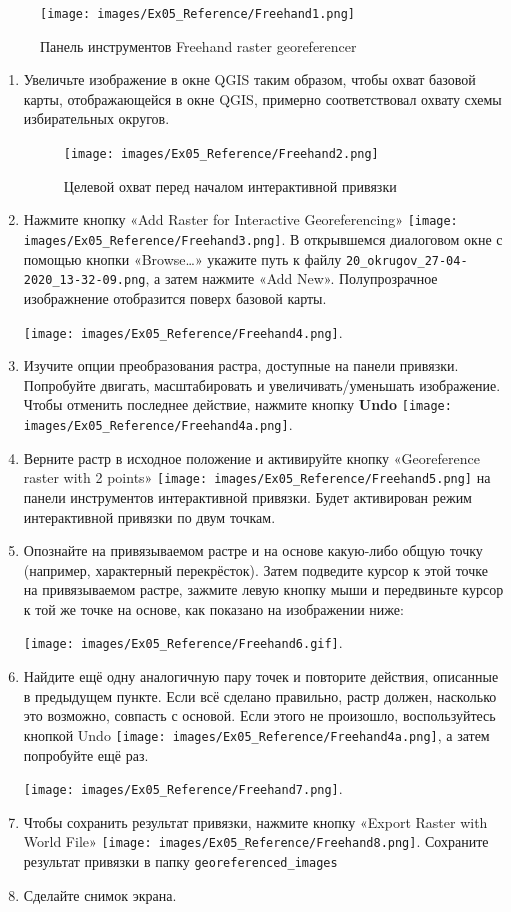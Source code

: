 \documentclass[
  12pt,
]{book}
\begin{document}
\begin{figure}
\centering
\texttt{[image: images/Ex05\_Reference/Freehand1.png]}
\caption{Панель инструментов Freehand raster georeferencer}
\end{figure}

\begin{enumerate}
\def\labelenumi{\arabic{enumi}.}
\setcounter{enumi}{4}
\item
  Увеличьте изображение в окне QGIS таким образом, чтобы охват базовой карты, отображающейся в окне QGIS, примерно соответствовал охвату схемы избирательных округов.

  \begin{figure}
  \centering
  \texttt{[image: images/Ex05\_Reference/Freehand2.png]}
  \caption{Целевой охват перед началом интерактивной привязки}
  \end{figure}
\item
  Нажмите кнопку «Add Raster for Interactive Georeferencing» \texttt{[image: images/Ex05\_Reference/Freehand3.png]}. В открывшемся диалоговом окне с помощью кнопки «Browse\ldots» укажите путь к файлу \texttt{20\_okrugov\_27-04-2020\_13-32-09.png}, а затем нажмите «Add New». Полупрозрачное изображнение отобразится поверх базовой карты.

  \texttt{[image: images/Ex05\_Reference/Freehand4.png]}.
\item
  Изучите опции преобразования растра, доступные на панели привязки. Попробуйте двигать, масштабировать и увеличивать/уменьшать изображение. Чтобы отменить последнее действие, нажмите кнопку \textbf{Undo} \texttt{[image: images/Ex05\_Reference/Freehand4a.png]}.
\item
  Верните растр в исходное положение и активируйте кнопку «Georeference raster with 2 points» \texttt{[image: images/Ex05\_Reference/Freehand5.png]} на панели инструментов интерактивной привязки. Будет активирован режим интерактивной привязки по двум точкам.
\item
  Опознайте на привязываемом растре и на основе какую-либо общую точку (например, характерный перекрёсток). Затем подведите курсор к этой точке на привязываемом растре, зажмите левую кнопку мыши и передвиньте курсор к той же точке на основе, как показано на изображении ниже:

  \texttt{[image: images/Ex05\_Reference/Freehand6.gif]}.
\item
  Найдите ещё одну аналогичную пару точек и повторите действия, описанные в предыдущем пункте. Если всё сделано правильно, растр должен, насколько это возможно, совпасть с основой. Если этого не произошло, воспользуйтесь кнопкой Undo \texttt{[image: images/Ex05\_Reference/Freehand4a.png]}, а затем попробуйте ещё раз.

  \texttt{[image: images/Ex05\_Reference/Freehand7.png]}.
\item
  Чтобы сохранить результат привязки, нажмите кнопку «Export Raster with World File» \texttt{[image: images/Ex05\_Reference/Freehand8.png]}. Сохраните результат привязки в папку \texttt{georeferenced\_images}
\item
  Сделайте снимок экрана.
\end{enumerate}
\end{document}
